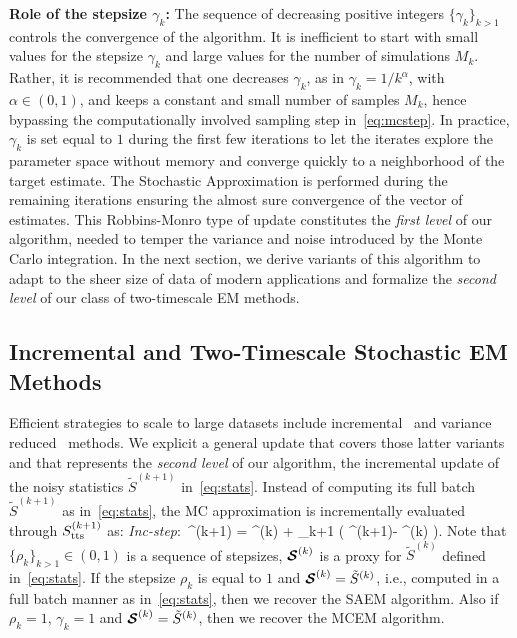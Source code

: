 \documentclass[12pt]{article}
\begin{document}
\medskip
\noindent \textbf{Role of the stepsize $\gamma_k$:}  The sequence of decreasing positive integers $\{ \gamma_{k} \}_{k>1}$ controls the convergence of the algorithm.
It is inefficient to start with small values for the stepsize $\gamma_k$ and large values for the number of simulations $M_k$. 
Rather, it is recommended that one decreases $\gamma_k$, as in $\gamma_k = 1/k^\alpha$, with $\alpha \in (0,1)$, and keeps a constant and small number of samples $M_k$, hence bypassing the computationally involved sampling step in~\eqref{eq:mcstep}.
 In practice, $\gamma_k$ is set equal to $1$ during the first few iterations to let the iterates explore the parameter space without memory and converge quickly to a neighborhood of the target estimate. 
 The Stochastic Approximation is performed during the remaining iterations ensuring the almost sure convergence of the vector of estimates.
This Robbins-Monro type of update constitutes the \textit{first level} of our algorithm, needed to temper the variance and noise introduced by the Monte Carlo integration.
In the next section, we derive variants of this algorithm to adapt to the sheer size of data of modern applications and formalize the \textit{second level} of our class of two-timescale EM methods.


\subsection{Incremental and Two-Timescale Stochastic EM Methods} \label{sec:sEM}

Efficient strategies to scale to large datasets include incremental~\citep{neal1998view} and variance reduced~\citep{chen2018stochastic, johnson:zhang:2013} methods.
We explicit a general update that covers those latter variants and that represents the \textit{second level} of our algorithm, \ie the incremental update of the noisy statistics $\tilde{S}^{(k+1)}$ in~\eqref{eq:stats}. 
Instead of computing its full batch $\tilde{S}^{(k+1)}$ as in~\eqref{eq:stats}, the MC approximation is incrementally evaluated through $S_{\textrm{tts}}^{(k+1)}$ as:
\beq \label{eq:sestep}
\textit{Inc-step}:~\stt^{(k+1)} = \stt^{(k)} + \rho_{k+1} ( \StocEstep^{(k+1)}- \stt^{(k)}  )\eqs.
\eeq
Note that $\{ \rho_{k} \}_{k>1} \in (0,1)$ is a sequence of stepsizes, ${\bm{\mathcal{S}}}^{(k)}$ is a proxy for $\tilde{S}^{(k)}$ defined in~\eqref{eq:stats}.
If the stepsize $\rho_{k}$ is equal to $1$ and ${\bm{\mathcal{S}}}^{(k)} = \tilde{S}^{(k)}$, i.e., computed in a full batch manner as in~\eqref{eq:stats}, then we recover the SAEM algorithm.
Also if $\rho_{k}=1$, $\gamma_{k}=1$ and ${\bm{\mathcal{S}}}^{(k)} = \tilde{S}^{(k)}$, then we recover the MCEM algorithm.
\end{document}
